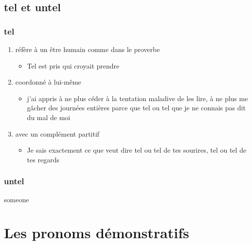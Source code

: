 \documentclass[UTF8]{report}
\begin{document}
\subsection{tel et untel}
\subsubsection{tel}
\begin{enumerate}
    \item réfère à un être humain comme dans le proverbe
    \begin{itemize}
        \item Tel est pris qui croyait prendre
    \end{itemize}
    \item coordonné à lui-même
    \begin{itemize}
        \item  j’ai appris à ne plus céder à la tentation maladive de les lire, à ne plus me gâcher des journées entières parce que tel ou tel que je ne connais pas dit du mal de moi
    \end{itemize}
    \item avec un complément partitif
    \begin{itemize}
        \item Je sais exactement ce que veut dire tel ou tel de tes sourires, tel ou tel de tes regards
    \end{itemize}
\end{enumerate}

\subsubsection{untel}
someone


\section{Les pronoms démonstratifs}
\end{document}
